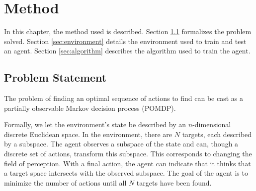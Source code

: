 \chapter{Method}
\label{cha:method}

% 


In this chapter, the method used is described.
Section \ref{sec:problem} formalizes the problem solved.
Section \ref{sec:environment} details the environment used to train and test an agent.
Section \ref{sec:algorithm} describes the algorithm used to train the agent.

\section{Problem Statement}
\label{sec:problem}


The problem of finding an optimal sequence of actions to find can be cast as a partially observable Markov decision process (POMDP). 

Formally, we let the environment's state be described by an \(n\)-dimensional discrete Euclidean space.
In the environment, there are \(N\) targets, each described by a subspace.
The agent observes a subspace of the state and can, though a discrete set of actions, transform this subspace.
This corresponds to changing the field of perception.
With a final action, the agent can indicate that it thinks that a target space intersects with the observed subspace.
The goal of the agent is to minimize the number of actions until all \(N\) targets have been found.

